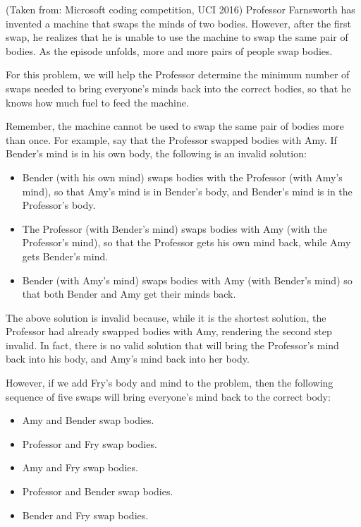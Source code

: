 \normalfont\documentclass[letterpaper,11pt]{article}
\begin{document}
(Taken from: Microsoft coding competition, UCI 2016) \newline
Professor Farnsworth has invented a machine that swaps the minds of two bodies. However, after the first swap, he realizes that he is unable to use the machine to swap the same pair of bodies. As the episode unfolds, more and more pairs of people swap bodies.

For this problem, we will help the Professor determine the minimum number of swaps needed to bring everyone's minds back into the correct bodies, so that he knows how much fuel to feed the machine.

Remember, the machine cannot be used to swap the same pair of bodies more than once. For example, say that the Professor swapped bodies with Amy. If Bender's mind is in his own body, the following is an invalid solution:

\begin{itemize}
\item Bender (with his own mind) swaps bodies with the Professor (with Amy's mind), so that Amy's mind is in Bender's body, and Bender's mind is in the Professor's body.
\item The Professor (with Bender's mind) swaps bodies with Amy (with the Professor's mind), so that the Professor gets his own mind back, while Amy gets Bender's mind.
\item Bender (with Amy's mind) swaps bodies with Amy (with Bender's mind) so that both Bender and Amy get their minds back.
\end{itemize}

The above solution is invalid because, while it is the shortest solution, the Professor had already swapped bodies with Amy, rendering the second step invalid. In fact, there is no valid solution that will bring the Professor's mind back into his body, and Amy's mind back into her body.

However, if we add Fry's body and mind to the problem, then the following sequence of five swaps will bring everyone's mind back to the correct body:

\begin{itemize}
\item Amy and Bender swap bodies.
\item Professor and Fry swap bodies.
\item Amy and Fry swap bodies.
\item Professor and Bender swap bodies.
\item Bender and Fry swap bodies.
\end{itemize}
\end{document}
